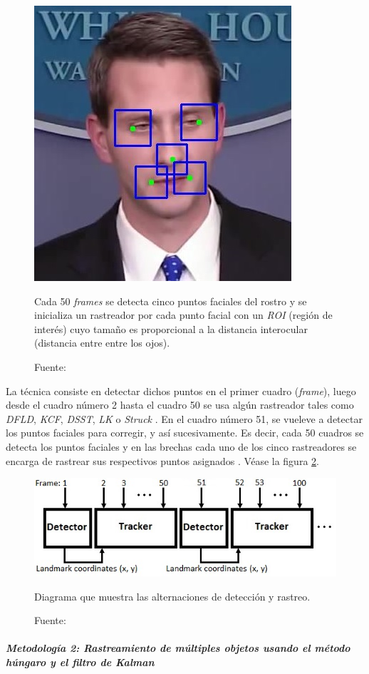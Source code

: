 \documentclass[a4paper,openright,12pt]{report}
\begin{document}
\begin{figure}[H]
  \centering
    \includegraphics[width=0.3\columnwidth]{../images/landmark-tracking-1.png}\par
  \caption{Cada 50 \textit{frames} se detecta cinco puntos faciales del rostro y
    se inicializa un rastreador por cada punto facial con un \textit{ROI}
    (región de interés) cuyo tamaño es proporcional a la distancia interocular
    (distancia entre entre los ojos).}
  \caption*{Fuente: \cite{wettum2017facial}}
  \label{fig:landmark-tracking-5-keypoints}
\end{figure}

La técnica consiste en detectar dichos puntos en el primer cuadro
(\textit{frame}), luego desde el cuadro número 2 hasta el cuadro 50 se usa algún
rastreador tales como \textit{DFLD}, \textit{KCF}, \textit{DSST}, \textit{LK} o
\textit{Struck} \cite{wettum2017facial}. En el cuadro número 51, se vueleve a
detectar los puntos faciales para corregir, y así sucesivamente. Es decir,
cada 50 cuadros se detecta los puntos faciales y en las brechas cada uno de los
cinco rastreadores se encarga de rastrear sus respectivos puntos asignados
\cite{wettum2017facial}. Véase la figura \ref{fig:landmark-tracking-diagram}.\\

\begin{figure}[H]
  \centering
    \includegraphics[width=0.5\columnwidth]{../images/landmark-tracking-2.png}\par
  \caption{Diagrama que muestra las alternaciones de detección y rastreo.}
  \caption*{Fuente: \cite{wettum2017facial}}
  \label{fig:landmark-tracking-diagram}
\end{figure}


\subparagraph{Metodología 2: Rastreamiento de múltiples objetos usando el
método húngaro y el filtro de Kalman}
\mbox{} \\
\end{document}
